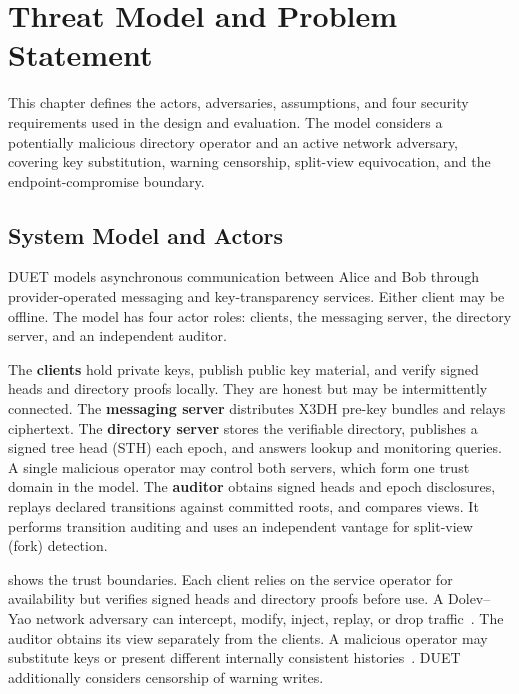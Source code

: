 \chapter{Threat Model and Problem Statement}\label{ch:threat}

This chapter defines the actors, adversaries, assumptions, and four security requirements used in
the design and evaluation. The model considers a potentially malicious directory operator and an
active network adversary, covering key substitution, warning censorship, split-view equivocation,
and the endpoint-compromise boundary.

\section{System Model and Actors}\label{sec:threat-system}

DUET models asynchronous communication between Alice and Bob through provider-operated messaging and
key-transparency services. Either client may be offline. The model has four actor roles: clients, the
messaging server, the directory server, and an independent auditor.

The \textbf{clients} hold private keys, publish public key material, and verify signed heads and
directory proofs locally. They are honest but may be intermittently connected. The \textbf{messaging server}
distributes X3DH pre-key bundles and relays ciphertext. The \textbf{directory server} stores the
verifiable directory, publishes a signed tree head (STH) each epoch, and answers lookup and monitoring
queries. A single malicious operator may control both servers, which form one trust domain in the
model. The \textbf{auditor} obtains signed heads and epoch disclosures, replays declared transitions
against committed roots, and compares views. It performs transition auditing and uses an independent
vantage for split-view (fork) detection.

 shows the trust boundaries. Each client relies on the service operator for
availability but verifies signed heads and directory proofs before use. A Dolev--Yao network adversary can intercept, modify,
inject, replay, or drop traffic~\cite{dolevyao1983}. The auditor obtains its view separately from the
clients. A malicious operator may substitute keys or present different internally consistent
histories~\cites{ietf-keytrans-architecture}[Sections~4.2 and 5]{yadav2022fakekey}.
DUET additionally considers censorship of warning writes.

